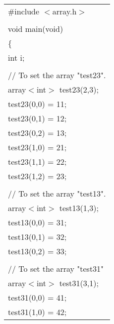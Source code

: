 {\small
\begin{center}
\begin{tabular}{|l|}\hline
\#include $<$array.h$>$\\
\hspace*{\textwidth}\\
void main(void)\\
\{\\
\hspace*{10mm}int i;\\
\\
\hspace*{10mm}// To set the array "test23".\\
\hspace*{10mm}array$<$int$>$ test23(2,3);\\
\hspace*{10mm}test23(0,0) = 11;\\
\hspace*{10mm}test23(0,1) = 12;\\
\hspace*{10mm}test23(0,2) = 13;\\
\hspace*{10mm}test23(1,0) = 21;\\
\hspace*{10mm}test23(1,1) = 22;\\
\hspace*{10mm}test23(1,2) = 23;\\
\\
\hspace*{10mm}// To set the array "test13".\\
\hspace*{10mm}array$<$int$>$ test13(1,3);\\
\hspace*{10mm}test13(0,0) = 31;\\
\hspace*{10mm}test13(0,1) = 32;\\
\hspace*{10mm}test13(0,2) = 33;\\
\\
\hspace*{10mm}// To set the array "test31"\\
\hspace*{10mm}array$<$int$>$ test31(3,1);\\
\hspace*{10mm}test31(0,0) = 41;\\
\hspace*{10mm}test31(1,0) = 42;\\

\end{tabular}
\end{center}}
